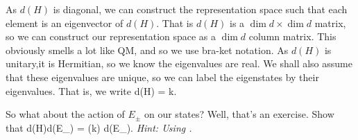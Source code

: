 As $d(H)$ is diagonal, we can construct the representation space such that each element is an eigenvector of $d(H)$. That is $d(H)$ is a $\dim d\times \dim d$ matrix, so we can construct our representation space as a $\dim d$ column matrix. This obviously smells a lot like QM, and so we use bra-ket notation. As $d(H)$ is unitary,it is Hermitian, so we know the eigenvalues are real. We shall also assume that these eigenvalues are unique, so we can label the eigenstates by their eigenvalues. That is, we write 
\be  
\label{eqn:dHket(k)}
    d(H) = k.
\ee 

So what about the action of $E_{\pm}$ on our states? Well, that's an exercise. 
\bbox 
    Show that 
    \bse 
        d(H)d(E_{\pm}) = (k) d(E_{\pm}).
    \ese 
    \textit{Hint: Using .}
\ebox 

